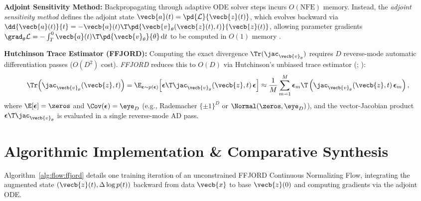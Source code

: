 \documentclass[../../../../master.tex]{subfiles}
\begin{document}
\textbf{Adjoint Sensitivity Method:} Backpropagating through adaptive ODE solver steps incurs $O(\text{NFE})$ memory. Instead, the \emph{adjoint sensitivity method} defines the adjoint state $\vecb{a}(t) = \pd{\mathcal{L}}{\vecb{z}(t)}$, which evolves backward via $\dd{\vecb{a}(t)}{t} = -\vecb{a}(t)\T \pd{\vecb{v}_\theta(\vecb{z}(t), t)}{\vecb{z}(t)}$, allowing parameter gradients $\grad_\theta \mathcal{L} = -\int_T^0 \vecb{a}(t)\T \pd{\vecb{v}_\theta}{\theta}\,\mathrm{d}t$ to be computed in $O(1)$ memory .

\textbf{Hutchinson Trace Estimator (FFJORD):} Computing the exact divergence $\Tr(\jac_{\vecb{v}_\theta})$ requires $D$ reverse-mode automatic differentiation passes ($O(D^2)$ cost). \emph{FFJORD} reduces this to $O(D)$ via Hutchinson's unbiased trace estimator (; ):
\begin{equation}\label{eq:flow:hutchinson}
  \Tr\!\left(\jac_{\vecb{v}_\theta}(\vecb{z}, t)\right) = \E_{\boldsymbol{\epsilon} \sim p(\boldsymbol{\epsilon})}\!\left[\boldsymbol{\epsilon}\T \jac_{\vecb{v}_\theta}(\vecb{z}, t)\,\boldsymbol{\epsilon}\right] \approx \frac{1}{M}\sum_{m=1}^M \boldsymbol{\epsilon}_m\T \left(\jac_{\vecb{v}_\theta}(\vecb{z}, t)\,\boldsymbol{\epsilon}_m\right),
\end{equation}
where $\E[\boldsymbol{\epsilon}] = \zeros$ and $\Cov(\boldsymbol{\epsilon}) = \eye_D$ (e.g., Rademacher $\{\pm 1\}^D$ or $\Normal(\zeros, \eye_D)$), and the vector-Jacobian product $\boldsymbol{\epsilon}\T \jac_{\vecb{v}_\theta}$ is evaluated in a single reverse-mode AD pass.

\section{Algorithmic Implementation \& Comparative Synthesis}\label{sec:flow:algorithms}

Algorithm~\ref{alg:flow:ffjord} details one training iteration of an unconstrained FFJORD Continuous Normalizing Flow, integrating the augmented state $(\vecb{z}(t), \Delta\log p(t))$ backward from data $\vecb{x}$ to base $\vecb{z}(0)$ and computing gradients via the adjoint ODE.
\end{document}
